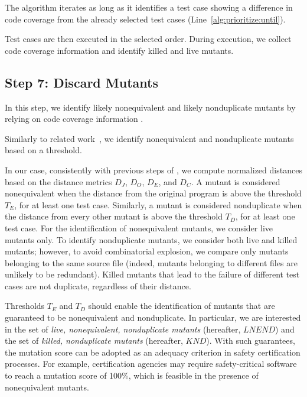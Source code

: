 The algorithm iterates as long as it identifies a test case
showing a difference in code coverage from the 
already selected test cases (Line~\ref{alg:prioritize:until}).

Test cases are then executed in the selected order. During  execution, we collect code coverage information and identify killed and live mutants.




\subsection{Step 7: Discard Mutants}
\label{sec:algostepSeven}


In this step, we identify likely nonequivalent and likely nonduplicate mutants by relying on code coverage information .

Similarly to related work~\cite{schuler2013covering}, 
we identify nonequivalent and nonduplicate mutants based on a threshold.

In our case, consistently with previous steps of \APPR,
we compute normalized distances based on the distance metrics $D_J$, $D_O$, $D_E$, and $D_C$. A mutant is considered nonequivalent when the distance from the original program is above the threshold $T_E$, for at least one test case.
Similarly, a mutant is considered nonduplicate when the distance from every other mutant is above the threshold $T_D$, for at least one test case. For the identification of nonequivalent mutants, we consider live mutants only. To identify nonduplicate mutants, we consider both live and killed mutants; however, to avoid combinatorial explosion, we compare only mutants belonging to the same source file (indeed, mutants belonging to different files are unlikely to be redundant). 
Killed mutants that lead to the failure of different test cases are not duplicate, regardless of their distance.

Thresholds $T_E$ and $T_D$ should enable the identification of mutants that are guaranteed to be nonequivalent and nonduplicate. In particular, we are interested in the set of \emph{live, nonequivalent, nonduplicate mutants} (hereafter, $\mathit{LNEND}$) and the set of \emph{killed, nonduplicate mutants} (hereafter, $\mathit{KND}$). With such guarantees, the mutation score can be adopted as an adequacy criterion in safety certification processes. For example, certification agencies may require safety-critical software to reach a mutation score of 100\%, which is feasible in the presence of nonequivalent mutants. 

